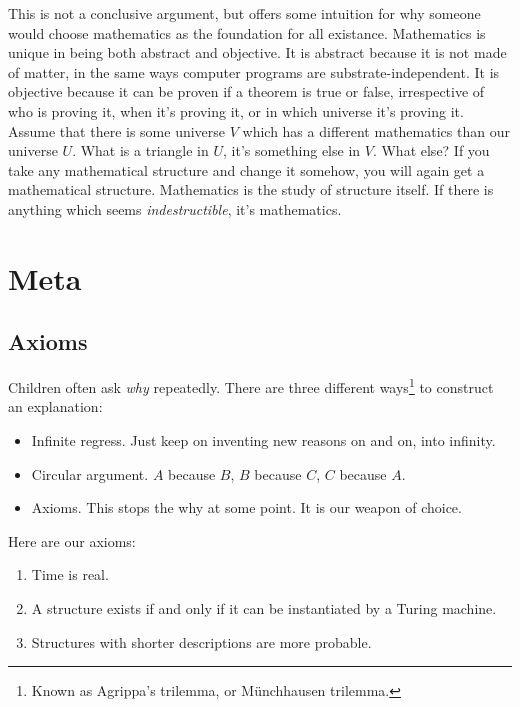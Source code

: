 This is not a conclusive argument, but offers some intuition for why someone would choose mathematics as the foundation for all existance.
Mathematics is unique in being both abstract and objective.
It is abstract because it is not made of matter, in the same ways computer programs are substrate-independent. 
It is objective because it can be proven if a theorem is true or false, irrespective of who is proving it, when it's proving it, or in which universe it's proving it.
Assume that there is some universe $V$ which has a different mathematics than our universe $U$.
What is a triangle in $U$, it's something else in $V$.
What else? 
If you take any mathematical structure and change it somehow, you will again get a mathematical structure.
Mathematics is the study of structure itself.
If there is anything which seems \textit{indestructible}, it's mathematics.

\newpage

\section{Meta}

\subsection{Axioms}

Children often ask \textit{why} repeatedly.
There are three different ways\footnote{Known as Agrippa's trilemma, or Münchhausen trilemma.} to construct an explanation:
\begin{itemize}
\setlength\itemsep{0px}
\item Infinite regress. Just keep on inventing new reasons on and on, into infinity.
\item Circular argument. $A$ because $B$, $B$ because $C$, $C$ because $A$.
\item Axioms. This stops the why at some point. It is our weapon of choice.
\end{itemize}

\noindent
Here are our axioms:

\begin{enumerate}
\setlength\itemsep{0px}
\item Time is real.
\item A structure exists if and only if it can be instantiated by a Turing machine.
\item Structures with shorter descriptions are more probable.
\end{enumerate} 

